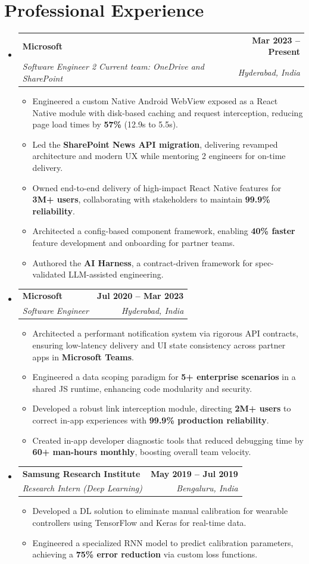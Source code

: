 \documentclass[a4paper,10pt]{article}
\makeatletter
\newcommand{\resumeSubheading}[4]{
  \vspace{-1pt}\item
  \begin{tabular*}{\textwidth}[t]{l@{\extracolsep{\fill}}r}
    \textbf{#1} & \textbf{#2} \\
    \textit{\small#3} & \textit{\small#4}
  \end{tabular*}\vspace{-6pt}
}
\newcommand{\resumeItem}[1]{\item \small{#1}}
\makeatother
\begin{document}
\section{Professional Experience}
\begin{itemize}
  \resumeSubheading{Microsoft}{Mar 2023 -- Present}{Software Engineer 2 \textnormal{\textbar{} Current team: OneDrive and SharePoint}}{Hyderabad, India}
  \begin{itemize}
    \resumeItem{Engineered a custom Native Android WebView exposed as a React Native module with disk-based caching and request interception, reducing page load times by \textbf{57\%} (12.9s to 5.5s).}
    \resumeItem{Led the \textbf{SharePoint News API migration}, delivering revamped architecture and modern UX while mentoring 2 engineers for on-time delivery.}
    \resumeItem{Owned end-to-end delivery of high-impact React Native features for \textbf{3M+ users}, collaborating with stakeholders to maintain \textbf{99.9\% reliability}.}
    \resumeItem{Architected a config-based component framework, enabling \textbf{40\% faster} feature development and onboarding for partner teams.}
    \resumeItem{Authored the \textbf{AI Harness}, a contract-driven framework for spec-validated LLM-assisted engineering.}
  \end{itemize}

  \resumeSubheading{Microsoft}{Jul 2020 -- Mar 2023}{Software Engineer}{Hyderabad, India}
  \begin{itemize}
    \resumeItem{Architected a performant notification system via rigorous API contracts, ensuring low-latency delivery and UI state consistency across partner apps in \textbf{Microsoft Teams}.}
    \resumeItem{Engineered a data scoping paradigm for \textbf{5+ enterprise scenarios} in a shared JS runtime, enhancing code modularity and security.}
    \resumeItem{Developed a robust link interception module, directing \textbf{2M+ users} to correct in-app experiences with \textbf{99.9\% production reliability}.}
    \resumeItem{Created in-app developer diagnostic tools that reduced debugging time by \textbf{60+ man-hours monthly}, boosting overall team velocity.}
  \end{itemize}

  \resumeSubheading{Samsung Research Institute}{May 2019 -- Jul 2019}{Research Intern (Deep Learning)}{Bengaluru, India}
  \begin{itemize}
    \resumeItem{Developed a DL solution to eliminate manual calibration for wearable controllers using TensorFlow and Keras for real-time data.}
    \resumeItem{Engineered a specialized RNN model to predict calibration parameters, achieving a \textbf{75\% error reduction} via custom loss functions.}
  \end{itemize}


\end{itemize}
\end{document}
